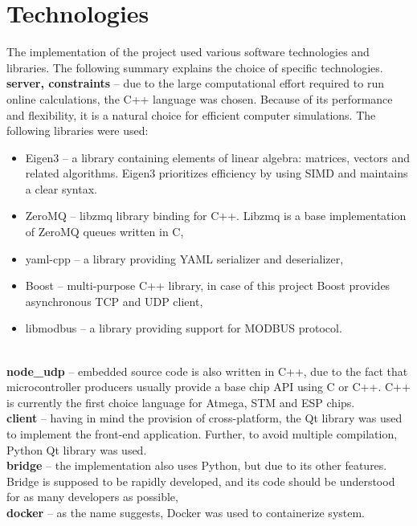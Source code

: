 \section{Technologies}

The implementation of the project used various software technologies and libraries. The following summary explains the choice of specific technologies.\\

\noindent\textbf{server, constraints} -- due to the large computational effort required to run online calculations, the C++ language was chosen. Because of its performance and flexibility, it is a natural choice for efficient computer simulations. The following libraries were used:
\begin{itemize}[noitemsep,nolistsep]
	\item Eigen3 -- a library containing elements of linear algebra: matrices, vectors and related algorithms. Eigen3 prioritizes efficiency by using SIMD and maintains a clear syntax.
	\item ZeroMQ -- libzmq library binding for C++. Libzmq is a base implementation of ZeroMQ queues written in C,
	\item yaml-cpp -- a library providing YAML serializer and deserializer,
	\item Boost -- multi-purpose C++ library, in case of this project Boost provides asynchronous TCP and UDP client,
	\item libmodbus -- a library providing support for MODBUS protocol.
\end{itemize}
\  \\
\textbf{node\_udp} -- embedded source code is also written in C++, due to the fact that microcontroller producers usually provide a base chip API using C or C++. C++ is currently the first choice language for Atmega, STM and ESP chips.\\

\noindent\textbf{client} -- having in mind the provision of cross-platform, the Qt library was used to implement the front-end application. Further, to avoid multiple compilation, Python Qt library was used. \\

\noindent\textbf{bridge} -- the implementation also uses Python, but due to its other features. Bridge is supposed to be rapidly developed, and its code should be understood for as many developers as possible,\\

\noindent\textbf{docker} -- as the name suggests, Docker was used to containerize system.   
	
